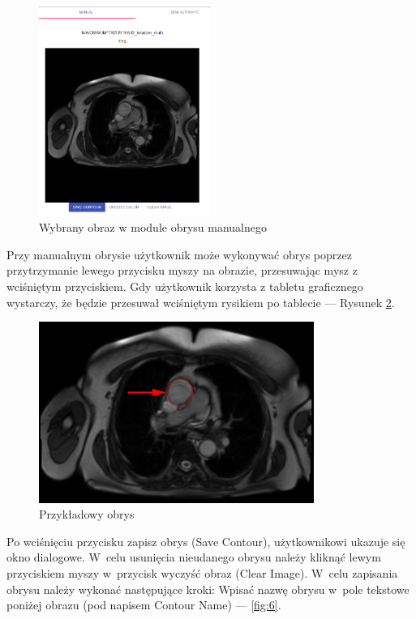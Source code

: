 \documentclass[a4paper,11pt,twoside,openright]{report}
\theoremstyle{definition}
\begin{document}
\begin{enumerate}
\begin{figure}[h!]
	\center
	\includegraphics[width=0.5\textwidth]{4}
	\caption{Wybrany obraz w module obrysu manualnego}
    	\label{fig:4}
\end{figure}

Przy manualnym obrysie użytkownik może wykonywać obrys poprzez przytrzymanie
lewego przycisku myszy na obrazie, przesuwając mysz z wciśniętym przyciskiem.
Gdy użytkownik korzysta z tabletu graficznego wystarczy, że będzie przesuwał
wciśniętym rysikiem po tablecie --- Rysunek \ref{fig:5}.

\begin{figure}[h!]
	\center
	\includegraphics[width=0.8\textwidth]{5}
	\caption{Przykładowy obrys}
    	\label{fig:5}
\end{figure}

\pagebreak

Po wciśnięciu przycisku zapisz obrys (Save Contour), użytkownikowi ukazuje się
okno dialogowe. W~celu usunięcia nieudanego obrysu należy kliknąć lewym przyciskiem
myszy w~przycisk wyczyść obraz (Clear Image). W~celu zapisania obrysu należy
wykonać następujące kroki: Wpisać nazwę obrysu w~pole tekstowe poniżej obrazu
(pod napisem Contour Name)  --- \ref{fig:6}.


\end{enumerate}
\end{document}
